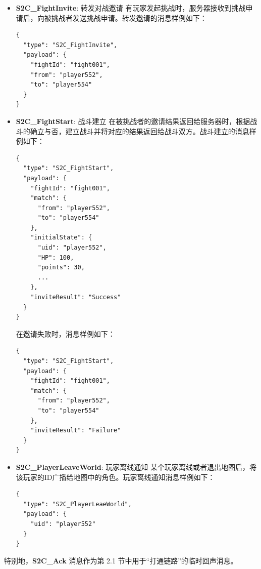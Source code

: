 \begin{itemize}
    \item \textbf{S2C\_FightInvite}: 转发对战邀请
        有玩家发起挑战时，服务器接收到挑战申请后，向被挑战者发送挑战申请。转发邀请的消息样例如下：
\begin{tcolorbox}[title=S2C\_FightInvite]
\begin{verbatim}
{
  "type": "S2C_FightInvite",
  "payload": {
    "fightId": "fight001",
    "from": "player552",
    "to": "player554"
  }
}
\end{verbatim}
\end{tcolorbox}
    \item \textbf{S2C\_FightStart}: 战斗建立
        在被挑战者的邀请结果返回给服务器时，根据战斗的确立与否，建立战斗并将对应的结果返回给战斗双方。战斗建立的消息样例如下：
\begin{tcolorbox}[title=S2C\_FightStart]
\begin{verbatim}
{
  "type": "S2C_FightStart",
  "payload": {
    "fightId": "fight001",
    "match": {
      "from": "player552",
      "to": "player554"
    },
    "initialState": {
      "uid": "player552",
      "HP": 100,
      "points": 30,
      ...
    },
    "inviteResult": "Success"
  }
}
\end{verbatim}
\end{tcolorbox}
        在邀请失败时，消息样例如下：
\begin{tcolorbox}[title=S2C\_FightStart]
\begin{verbatim}
{
  "type": "S2C_FightStart",
  "payload": {
    "fightId": "fight001",
    "match": {
      "from": "player552",
      "to": "player554"
    },
    "inviteResult": "Failure"
  }
}
\end{verbatim}
\end{tcolorbox}

    \item \textbf{S2C\_PlayerLeaveWorld}: 玩家离线通知
        某个玩家离线或者退出地图后，将该玩家的ID广播给地图中的角色。玩家离线通知消息样例如下：
\begin{tcolorbox}[title=S2C\_PlayerLeaveWorld]
\begin{verbatim}
{
  "type": "S2C_PlayerLeaeWorld",
  "payload": {
    "uid": "player552"
  }
}
\end{verbatim}
\end{tcolorbox}
\end{itemize}

特别地，\textbf{S2C\_Ack} 消息作为第 2.1 节中用于``打通链路''的临时回声消息。

\newpage